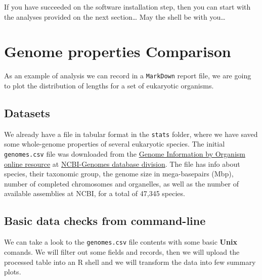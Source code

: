\documentclass[10pt,a4paper,]{article}
\begin{document}
If you have succeeded on the software installation step, then you can
start with the analyses provided on the next section\ldots{} May the
shell be with you\ldots{}

\newpage

\hypertarget{genome-properties-comparison}{%
\section{Genome properties
Comparison}\label{genome-properties-comparison}}

As an example of analysis we can record in a \texttt{MarkDown} report
file, we are going to plot the distribution of lengths for a set of
eukaryotic organisms.

\hypertarget{datasets}{%
\subsection{Datasets}\label{datasets}}

We already have a file in tabular format in the \texttt{stats} folder,
where we have saved some whole-genome properties of several eukaryotic
species. The initial \texttt{genomes.csv} file was downloaded from the
\href{https://www.ncbi.nlm.nih.gov/genome/browse\#!/overview/}{Genome
Information by Organism online resource} at
\href{https://www.ncbi.nlm.nih.gov/genome/}{NCBI-Genomes database
division}. The file has info about species, their taxonomic group, the
genome size in mega-basepairs (Mbp), number of completed chromosomes and
organelles, as well as the number of available assemblies at NCBI, for a
total of 47,345 species.

\hypertarget{basic-data-checks-from-command-line}{%
\subsection{Basic data checks from
command-line}\label{basic-data-checks-from-command-line}}

We can take a look to the \texttt{genomes.csv} file contents with some
basic \textbf{Unix} comands. We will filter out some fields and records,
then we will upload the processed table into an R shell and we will
transform the data into few summary plots.
\end{document}
